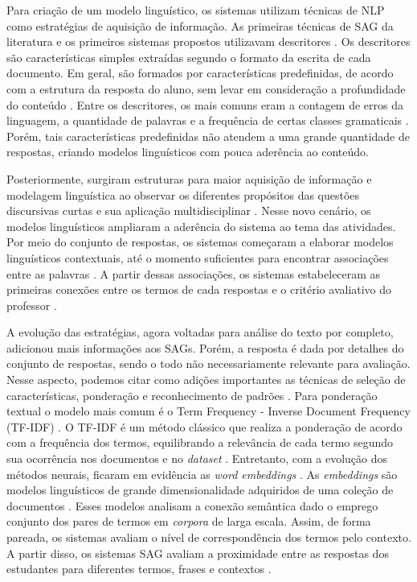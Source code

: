 Para criação de um modelo linguístico, os sistemas utilizam técnicas de NLP como estratégias de aquisição de informação. As primeiras técnicas de SAG da literatura e os primeiros sistemas propostos utilizavam descritores \cite{galhardi2018a}. Os descritores são características simples extraídas segundo o formato da escrita de cada documento. Em geral, são formados por características predefinidas, de acordo com a estrutura da resposta do aluno, sem levar em consideração a profundidade do conteúdo \cite{mohler2009}. Entre os descritores, os mais comuns eram a contagem de erros da linguagem, a quantidade de palavras e a frequência de certas classes gramaticais \cite{ galhardi2018b, riordan2019}. Porém, tais características predefinidas não atendem a uma grande quantidade de respostas, criando modelos linguísticos com pouca aderência ao conteúdo.

Posteriormente, surgiram estruturas para maior aquisição de informação e modelagem linguística ao observar os diferentes propósitos das questões discursivas curtas e sua aplicação multidisciplinar \cite{saha2018, kumar2019}. Nesse novo cenário, os modelos linguísticos ampliaram a aderência do sistema ao tema das atividades. Por meio do conjunto de respostas, os sistemas começaram a elaborar modelos linguísticos contextuais, até o momento suficientes para encontrar associações entre as palavras \cite{tan2020}. A partir dessas associações, os sistemas estabeleceram as primeiras conexões entre os termos de cada respostas e o critério avaliativo do professor \cite{sahu2020}.

A evolução das estratégias, agora voltadas para análise do texto por completo, adicionou mais informações aos SAGs. Porém, a resposta é dada por detalhes do conjunto de respostas, sendo o todo não necessariamente relevante para avaliação. Nesse aspecto, podemos citar como adições importantes as técnicas de seleção de características, ponderação e reconhecimento de padrões \cite{banjade2016}. Para ponderação textual o modelo mais comum é o Term Frequency - Inverse Document Frequency (TF-IDF) \cite{baeza2011}. O TF-IDF é um método clássico que realiza a ponderação de acordo com a frequência dos termos, equilibrando a relevância de cada termo segundo sua ocorrência nos documentos e no \textit{dataset} \cite{sultan2016}. Entretanto, com a evolução dos métodos neurais, ficaram em evidência as \textit{word embeddings} \cite{jurafsky2009}. As \textit{embeddings} são modelos linguísticos de grande dimensionalidade adquiridos de uma coleção de documentos \cite{goldberg2017}. Esses modelos analisam a conexão semântica dado o emprego conjunto dos pares de termos em \textit{corpora} de larga escala. Assim, de forma pareada, os sistemas avaliam o nível de correspondência dos termos pelo contexto. A partir disso, os sistemas SAG avaliam a proximidade entre as respostas dos estudantes para diferentes termos, frases e contextos \cite{sung2019b, ghavidel2020, galhardi2020, haller2022}.

